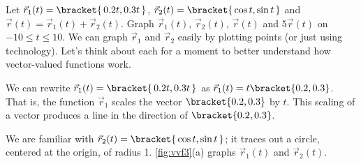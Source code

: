 \begin{example}\label{ex_vvf3}
Let $\vec r_1(t) =\bracket{\,0.2t,0.3t\,}$, $\vec r_2(t) =\bracket{\,\cos t,\sin t\,}$ and $\vec r(t) = \vec r_1(t)+\vec r_2(t)$. Graph $\vec r_1(t)$, $\vec r_2(t)$, $\vec r(t)$ and $5\vec r(t)$ on $-10\leq t\leq10$.
\solution
We can graph $\vec r_1$ and $\vec r_2$ easily by plotting points (or just using technology). Let's think about each for a moment to better understand how vector-valued functions work.

We can rewrite $\vec r_1(t) =\bracket{\, 0.2t,0.3t\,}$ as $ \vec r_1(t) = t\bracket{0.2,0.3}$. That is, the function $\vec r_1$ scales the vector $\bracket{0.2,0.3}$ by $t$. This scaling of a vector produces a line in the direction of $\bracket{0.2,0.3}$.

We are familiar with $\vec r_2(t) =\bracket{\, \cos t,\sin t\,}$; it traces out a circle, centered at the origin, of radius 1. \autoref{fig:vvf3}(a) graphs $\vec r_1(t)$ and $\vec r_2(t)$.


\end{example}
